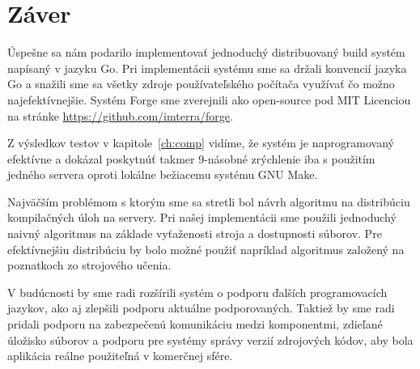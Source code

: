 \chapter*{Záver}

Úspešne sa nám podarilo implementovať jednoduchý distribuovaný build systém napísaný
v jazyku Go. Pri implementácii systému sme sa držali konvencií jazyka Go a snažili
sme sa všetky zdroje používateľského počítača využívať čo možno najefektívnejšie.
Systém Forge sme zverejnili ako open-source pod MIT Licenciou na stránke
\url{https://github.com/imterra/forge}.

Z výsledkov testov v kapitole~\ref{ch:comp} vidíme, že systém je naprogramovaný
efektívne a dokázal poskytnúť takmer 9-násobné zrýchlenie iba s použitím jedného
servera oproti lokálne bežiacemu systému GNU Make.

Najväčším problémom s ktorým sme sa stretli bol návrh algoritmu na distribúciu
kompilačných úloh na servery. Pri našej implementácii sme použili jednoduchý
naivný algoritmus na základe vyťaženosti stroja a dostupnosti súborov. Pre
efektívnejšiu distribúciu by bolo možné použiť napríklad algoritmus založený
na poznatkoch zo strojového učenia.

V budúcnosti by sme radi rozšírili systém o podporu ďalších programovacích jazykov,
ako aj zlepšili podporu aktuálne podporovaných. Taktiež by sme radi pridali
podporu na zabezpečenú komunikáciu medzi komponentmi, zdieľané úložisko súborov
a podporu pre systémy správy verzií zdrojových kódov, aby bola aplikácia reálne
použiteľná v komerčnej sfére.
